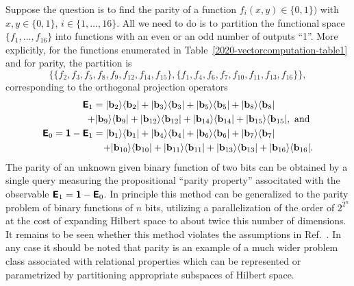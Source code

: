 \documentclass{ws-procs9x6}
\begin{document}
Suppose the question is to find the parity of a function $f_i(x,y) \in \{0,1\})$ with $x,y \in \{0,1\}$, $i\in \{1,\ldots ,16\}$.
All we need to do is to partition the functional space
$\big\{   f_1  , \ldots ,   f_{16}   \big\}$
into functions with an even or an odd number of outputs ``1''. More explicitly, for the functions enumerated in Table~\ref{2020-vectorcomputation-table1} and for parity,
the partition is
\begin{equation}
 \Big\{
\big\{
 f_2, f_3,f_5,f_8,f_9,f_{12},f_{14},f_{15}
\big\}
,
\big\{
 f_1, f_4,f_6,f_7,f_{10},f_{11},f_{13},f_{16}
\big\}
\Big\}
,
\end{equation}
corresponding to the orthogonal projection operators
\begin{equation}
\begin{split}
\textsf{\textbf{E}}_1 =
 \vert \mathbf{b}_2 \rangle \langle \mathbf{b}_2 \vert
+\vert \mathbf{b}_3 \rangle \langle \mathbf{b}_3 \vert
+\vert \mathbf{b}_5 \rangle \langle \mathbf{b}_5 \vert
+\vert \mathbf{b}_8 \rangle \langle \mathbf{b}_8 \vert \qquad \qquad \\
+\vert \mathbf{b}_9 \rangle \langle \mathbf{b}_9 \vert
+\vert \mathbf{b}_{12} \rangle \langle \mathbf{b}_{12} \vert
+\vert \mathbf{b}_{14} \rangle \langle \mathbf{b}_{14} \vert
+\vert \mathbf{b}_{15} \rangle \langle \mathbf{b}_{15} \vert
,\text{ and }\\
\textsf{\textbf{E}}_0 =  \textsf{\textbf{1}} - \textsf{\textbf{E}}_1 =
 \vert \mathbf{b}_1 \rangle \langle \mathbf{b}_1 \vert
+\vert \mathbf{b}_4 \rangle \langle \mathbf{b}_4 \vert
+\vert \mathbf{b}_6 \rangle \langle \mathbf{b}_6 \vert
+\vert \mathbf{b}_7 \rangle \langle \mathbf{b}_7 \vert \qquad \qquad \\
+\vert \mathbf{b}_{10} \rangle \langle \mathbf{b}_{10} \vert
+\vert \mathbf{b}_{11} \rangle \langle \mathbf{b}_{11} \vert
+\vert \mathbf{b}_{13} \rangle \langle \mathbf{b}_{13} \vert
+\vert \mathbf{b}_{16} \rangle \langle \mathbf{b}_{16} \vert
.
\end{split}
\end{equation}
The parity of an unknown given binary function of two bits
can be obtained by a single query measuring the
propositional ``parity property''
associtated with the observable $\textsf{\textbf{E}}_1  = \textsf{\textbf{1}} - \textsf{\textbf{E}}_0$.
In principle this method can be generalized to the parity problem of binary functions of $n$ bits,
utilizing a parallelization of the order of $2^{2^n}$ at the cost of expanding Hilbert space to about twice this number of dimensions.
It remains to be seen whether this method violates the assumptions in Ref.~\cite{Farhi-98}.
In any case it should be noted that parity is an example of a much wider problem class associated with relational properties
which can be represented or parametrized by partitioning appropriate subspaces of Hilbert space.
\end{document}
